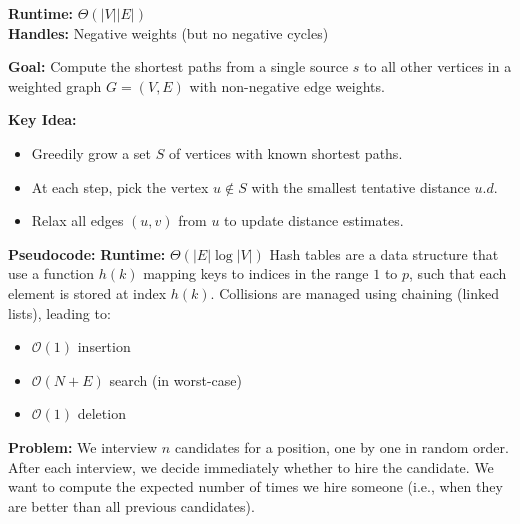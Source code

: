 \documentclass[a4paper,landscape]{article}
\begin{document}
\begin{multicols}{7}
\textbf{Runtime:} $\Theta(|V||E|)$ \\
\textbf{Handles:} Negative weights (but no negative cycles)
\endtcolorbox

\tcolorbox[mybox={Dijkstra’s Algorithm}]
\textbf{Goal:} Compute the shortest paths from a single source $s$ to all other vertices in a weighted graph $G = (V, E)$ with non-negative edge weights.

\textbf{Key Idea:}
\begin{itemize}[noitemsep, topsep=0pt]
    \item Greedily grow a set $S$ of vertices with known shortest paths.
    \item At each step, pick the vertex $u \notin S$ with the smallest tentative distance $u.d$.
    \item Relax all edges $(u, v)$ from $u$ to update distance estimates.
\end{itemize}
\textbf{Pseudocode:}
\textbf{Runtime:} $\Theta(|E| \log |V|)$
\endtcolorbox
\tcolorbox[mybox={HTable}]
Hash tables are a data structure that use a function $h(k)$ mapping keys to indices in the range $1$ to $p$, such that each element is stored at index $h(k)$.  
Collisions are managed using chaining (linked lists), leading to:
\begin{itemize}
  \item $\mathcal{O}(1)$ insertion
  \item $\mathcal{O}(N + E)$ search (in worst-case)
  \item $\mathcal{O}(1)$ deletion
\end{itemize}
\endtcolorbox

\tcolorbox[mybox={The Hiring Problem}]
\textbf{Problem:} We interview $n$ candidates for a position, one by one in random order. After each interview, we decide immediately whether to hire the candidate. We want to compute the expected number of times we hire someone (i.e., when they are better than all previous candidates).



\end{multicols}
\end{document}
